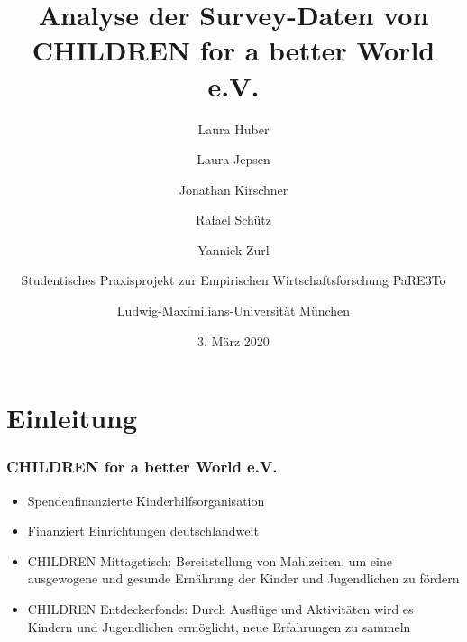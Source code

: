 

%





\title[Analyse der Survey-Daten von CHILDREN]{Analyse der Survey-Daten von CHILDREN for a better World e.V.
	}
\author[Laura, Laura, Jonathan, Rafael und Yannick]{
Laura Huber\\
\and
Laura Jepsen\\
\and
Jonathan Kirschner\\
\and
Rafael Schütz\\
\and
Yannick Zurl\\
\and
Studentisches Praxisprojekt zur Empirischen Wirtschaftsforschung PaRE3To\\
\and
Ludwig-Maximilians-Universität München}
\date{3. März 2020}


\begin{frame}
	\maketitle
\end{frame}



\section{Einleitung}

\begin{frame}[fragile]
\frametitle{CHILDREN for a better World e.V.}
\begin{itemize}
 \item<1-> Spendenfinanzierte Kinderhilfsorganisation
 \item<2-> Finanziert Einrichtungen deutschlandweit
 \linebreak
 \item<3-> CHILDREN Mittagstisch: Bereitstellung von Mahlzeiten, um eine ausgewogene und gesunde Ernährung der Kinder und Jugendlichen zu fördern
 \item<4-> CHILDREN Entdeckerfonds: Durch Ausflüge und Aktivitäten wird es Kindern und Jugendlichen ermöglicht, neue Erfahrungen zu sammeln
\end{itemize}
\end{frame}

